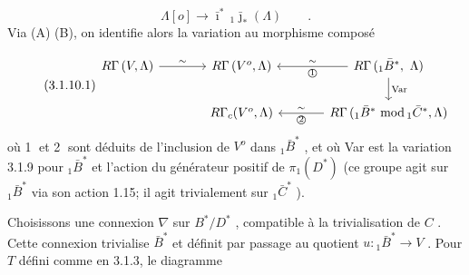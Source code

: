 \begin{equation*}
\Lambda[o] \longrightarrow \bar{\imath}^*\, {}_1\bar{\jmath}_*(\Lambda) \qquad .
\end{equation*}
Via (A) (B), on identifie alors la variation au morphisme composé

\begin{equation}\tag{3.1.10.1}
\begin{tikzcd}[column sep=large]
R\Gamma\,(V,\Lambda) \arrow[r, "\sim"] & R\Gamma\,(V^o,\Lambda) & R\Gamma\,({}_1\bar{B}^*,\ \Lambda) \arrow[l, "\sim"', "\text{\textcircled{1}}"] \arrow[d, "\mathrm{Var}"] \\
{} & R\Gamma_c(V^o,\Lambda) & R\Gamma\,({}_1\bar{B}^*\ \mathrm{mod}\,{}_1\bar{C}^*,\Lambda) \arrow[l, "\sim"', "\text{\textcircled{2}}"]
\end{tikzcd}
\end{equation}
où \textcircled{1} et \textcircled{2} sont déduits de l'inclusion de $V^o$ dans ${}_1\bar{B}^*$ , et où Var est la variation 3.1.9 pour ${}_1\bar{B}^*$ et l'action du générateur positif de $\pi_1(D^*)$ (ce groupe agit sur ${}_1\bar{B}^*$ via son action 1.15; il agit trivialement sur ${}_1\bar{C}^*$ ).

Choisissons une connexion $\nabla$ sur $B^*/D^*$ , compatible à la trivialisation de $C$ . Cette connexion trivialise $\bar{B}^*$ et définit par passage au quotient $u : {}_1\bar{B}^* \longrightarrow V$ . Pour $T$ défini comme en 3.1.3, le diagramme 


